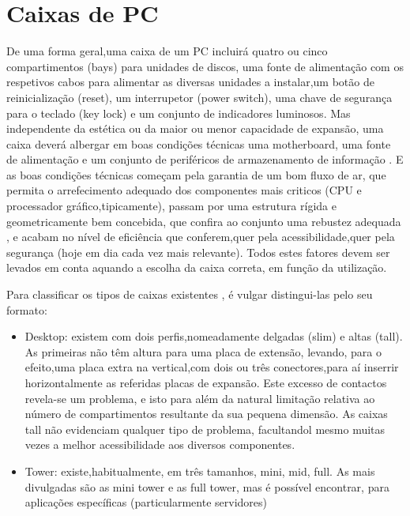 
\chapter{Caixas de PC} 
\label{chap.chassi}
 De uma forma geral,uma caixa de um PC incluirá quatro ou cinco compartimentos (bays) para unidades de discos, uma fonte de alimentação com os respetivos cabos para alimentar as diversas unidades a instalar,um botão de reinicialização (reset), um interrupetor (power switch), uma chave de segurança para o teclado (key lock) e um conjunto de indicadores luminosos. Mas independente da estética ou da maior ou menor capacidade de expansão, uma caixa deverá albergar em boas condições técnicas uma motherboard, uma fonte de alimentação e um conjunto de periféricos de armazenamento de informação . E as boas condições técnicas começam pela garantia de um bom fluxo de ar, que permita o arrefecimento adequado dos componentes mais criticos (CPU e processador gráfico,tipicamente), passam por uma estrutura rígida e geometricamente bem concebida, que confira ao conjunto uma rebustez adequada , e acabam no nível de eficiência que conferem,quer pela acessibilidade,quer pela segurança (hoje em dia cada vez mais relevante). Todos estes fatores devem ser levados em conta aquando a escolha da caixa correta, em função da utilização.

 Para classificar os tipos de caixas existentes , é vulgar distingui-las pelo seu formato:
\begin{itemize}

\item Desktop: existem com dois perfis,nomeadamente delgadas (slim) e altas (tall). As primeiras não têm altura para uma placa de extensão, levando, para o efeito,uma placa extra na vertical,com dois ou três conectores,para aí inserrir horizontalmente as referidas placas de expansão. Este excesso de contactos revela-se um problema, e isto para além da natural limitação relativa ao número de compartimentos resultante da sua pequena dimensão. As caixas tall não evidenciam qualquer tipo de problema, facultandol mesmo muitas vezes a melhor acessibilidade aos diversos componentes. 

\item Tower: existe,habitualmente, em três tamanhos, mini, mid, full. As mais divulgadas são as mini tower e as full tower, mas é possível encontrar, para aplicações específicas (particularmente servidores)
\end{itemize}

